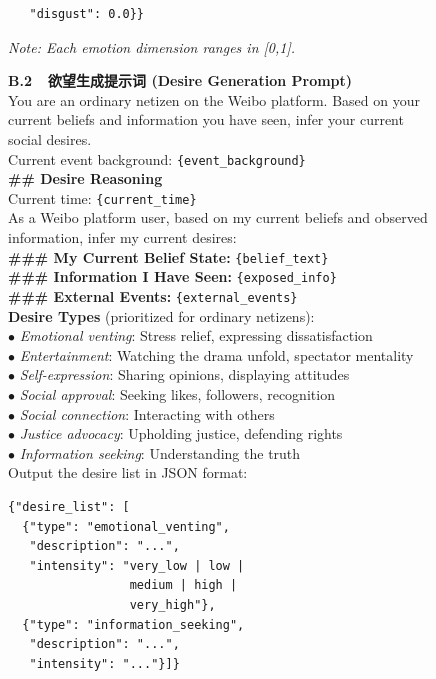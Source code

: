 \documentclass[lettersize,journal]{IEEEtran}
\begin{document}
\begin{figure}[!t]
\begin{minipage}[t]{0.48\textwidth}
\begin{promptbox}
\begin{verbatim}
   "disgust": 0.0}}
\end{verbatim}
\vspace{-8pt}
\textit{Note: Each emotion dimension ranges in [0,1].}
\end{promptbox}
\end{minipage}
\hfill
\begin{minipage}[t]{0.48\textwidth}
\begin{promptbox}
\scriptsize
\textbf{B.2~~欲望生成提示词 (Desire Generation Prompt)}\\[3pt]
You are an ordinary netizen on the Weibo platform. Based on your current beliefs and information you have seen, infer your current social desires.\\[2pt]
Current event background: \texttt{\{event\_background\}}\\[2pt]
\textbf{\#\# Desire Reasoning}\\
Current time: \texttt{\{current\_time\}}\\[2pt]
As a Weibo platform user, based on my current beliefs and observed information, infer my current desires:\\
\textbf{\#\#\# My Current Belief State:} \texttt{\{belief\_text\}}\\
\textbf{\#\#\# Information I Have Seen:} \texttt{\{exposed\_info\}}\\
\textbf{\#\#\# External Events:} \texttt{\{external\_events\}}\\[2pt]
\textbf{Desire Types} (prioritized for ordinary netizens):\\
$\bullet$ \textit{Emotional venting}: Stress relief, expressing dissatisfaction\\
$\bullet$ \textit{Entertainment}: Watching the drama unfold, spectator mentality\\
$\bullet$ \textit{Self-expression}: Sharing opinions, displaying attitudes\\
$\bullet$ \textit{Social approval}: Seeking likes, followers, recognition\\
$\bullet$ \textit{Social connection}: Interacting with others\\
$\bullet$ \textit{Justice advocacy}: Upholding justice, defending rights\\
$\bullet$ \textit{Information seeking}: Understanding the truth\\[2pt]
Output the desire list in JSON format:
\begin{verbatim}
{"desire_list": [
  {"type": "emotional_venting",
   "description": "...",
   "intensity": "very_low | low |
                 medium | high |
                 very_high"},
  {"type": "information_seeking",
   "description": "...",
   "intensity": "..."}]}
\end{verbatim}
\end{promptbox}
\end{minipage}
\end{figure}
\end{document}
